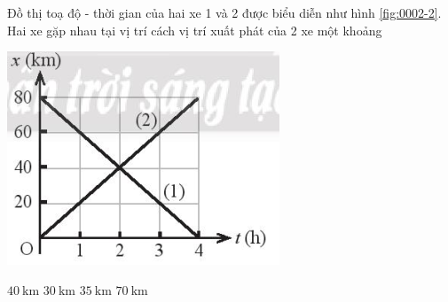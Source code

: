 \begin{ex}
	Đồ thị toạ độ - thời gian của hai xe 1 và 2 được biểu diễn như hình \ref{fig:0002-2}. Hai xe gặp nhau tại vị trí cách vị trí xuất phát của 2 xe một khoảng
	\begin{center}
		\includegraphics[scale=0.5]{figs/G10Y25B5-4}
		\label{fig:0002-2}
	\end{center}
	\choice
	{\True $\SI{40}{\kilo\meter}$}
	{$\SI{30}{\kilo\meter}$}
	{$\SI{35}{\kilo\meter}$}
	{$\SI{70}{\kilo\meter}$}
	\loigiai{}
\end{ex}

